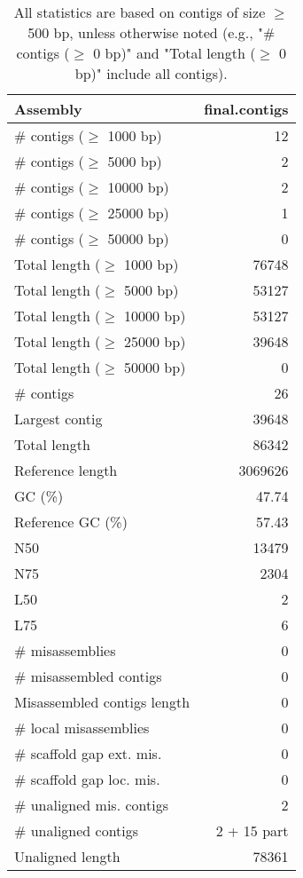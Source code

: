 \documentclass[12pt,a4paper]{article}
\begin{document}
\begin{table}[ht]
\begin{center}
\caption{All statistics are based on contigs of size $\geq$ 500 bp, unless otherwise noted (e.g., "\# contigs ($\geq$ 0 bp)" and "Total length ($\geq$ 0 bp)" include all contigs).}
\begin{tabular}{|l*{1}{|r}|}
\hline
Assembly & final.contigs \\ \hline
\# contigs ($\geq$ 1000 bp) & 12 \\ \hline
\# contigs ($\geq$ 5000 bp) & 2 \\ \hline
\# contigs ($\geq$ 10000 bp) & 2 \\ \hline
\# contigs ($\geq$ 25000 bp) & 1 \\ \hline
\# contigs ($\geq$ 50000 bp) & 0 \\ \hline
Total length ($\geq$ 1000 bp) & 76748 \\ \hline
Total length ($\geq$ 5000 bp) & 53127 \\ \hline
Total length ($\geq$ 10000 bp) & 53127 \\ \hline
Total length ($\geq$ 25000 bp) & 39648 \\ \hline
Total length ($\geq$ 50000 bp) & 0 \\ \hline
\# contigs & 26 \\ \hline
Largest contig & 39648 \\ \hline
Total length & 86342 \\ \hline
Reference length & 3069626 \\ \hline
GC (\%) & 47.74 \\ \hline
Reference GC (\%) & 57.43 \\ \hline
N50 & 13479 \\ \hline
N75 & 2304 \\ \hline
L50 & 2 \\ \hline
L75 & 6 \\ \hline
\# misassemblies & 0 \\ \hline
\# misassembled contigs & 0 \\ \hline
Misassembled contigs length & 0 \\ \hline
\# local misassemblies & 0 \\ \hline
\# scaffold gap ext. mis. & 0 \\ \hline
\# scaffold gap loc. mis. & 0 \\ \hline
\# unaligned mis. contigs & 2 \\ \hline
\# unaligned contigs & 2 + 15 part \\ \hline
Unaligned length & 78361 \\ \hline

\end{tabular}
\end{center}
\end{table}
\end{document}
